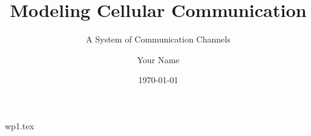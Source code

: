 \documentclass[10pt]{beamer}
\begin{document}
\begin{frame}
    \title{Modeling Cellular Communication}
    \subtitle{A System of Communication Channels}
    \author{Your Name}
    \date{\today}
    \maketitle
\end{frame}
{wp1.tex}
\end{document}
